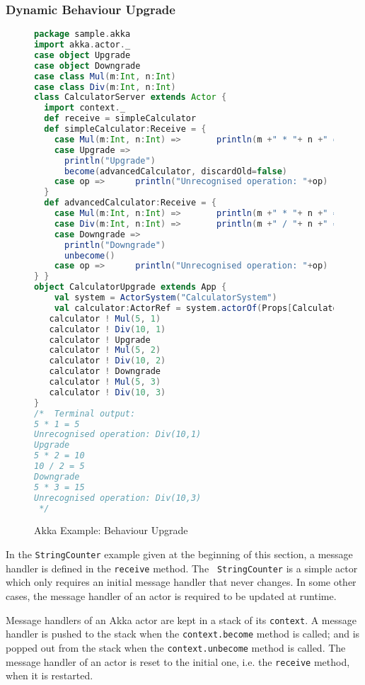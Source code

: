 \subsubsection{Dynamic Behaviour Upgrade}
\label{akka_hot_swap}

\begin{figure}[p]
\begin{lstlisting}[language=scala]
package sample.akka
import akka.actor._
case object Upgrade
case object Downgrade
case class Mul(m:Int, n:Int) 
case class Div(m:Int, n:Int)
class CalculatorServer extends Actor { 
  import context._
  def receive = simpleCalculator
  def simpleCalculator:Receive = {
    case Mul(m:Int, n:Int) =>       println(m +" * "+ n +" = "+ (m*n))
    case Upgrade =>
      println("Upgrade")
      become(advancedCalculator, discardOld=false)
    case op =>      println("Unrecognised operation: "+op)
  }
  def advancedCalculator:Receive = {
    case Mul(m:Int, n:Int) =>       println(m +" * "+ n +" = "+ (m*n))
    case Div(m:Int, n:Int) =>       println(m +" / "+ n +" = "+ (m/n))
    case Downgrade =>
      println("Downgrade")
      unbecome()
    case op =>      println("Unrecognised operation: "+op)
} }  
object CalculatorUpgrade extends App {
    val system = ActorSystem("CalculatorSystem") 
    val calculator:ActorRef = system.actorOf(Props[CalculatorServer], "calculator")   
   calculator ! Mul(5, 1)
   calculator ! Div(10, 1)
   calculator ! Upgrade
   calculator ! Mul(5, 2)
   calculator ! Div(10, 2)
   calculator ! Downgrade
   calculator ! Mul(5, 3)
   calculator ! Div(10, 3)
}
/*  Terminal output:
5 * 1 = 5
Unrecognised operation: Div(10,1)
Upgrade
5 * 2 = 10
10 / 2 = 5
Downgrade
5 * 3 = 15
Unrecognised operation: Div(10,3)
 */
\end{lstlisting}
  \caption{Akka Example: Behaviour Upgrade}
  \label{fig:akka_swap} 
\end{figure}

In the {\tt StringCounter} example given at the beginning of this section, a 
message handler is defined in the {\tt receive} method.  The {\tt 
StringCounter} is a simple actor which only requires an initial message handler 
that never changes.  In some other cases, the message handler of an actor is 
required to be updated at runtime.

Message handlers of an Akka actor are kept in a stack of its {\tt context}.  A 
message handler is pushed to the stack when the {\tt context.become} method 
is called; and is popped out from the stack when the {\tt context.unbecome} 
method is called. The message handler of an actor is reset to the initial one, 
i.e. the {\tt receive} method, when it is restarted.


